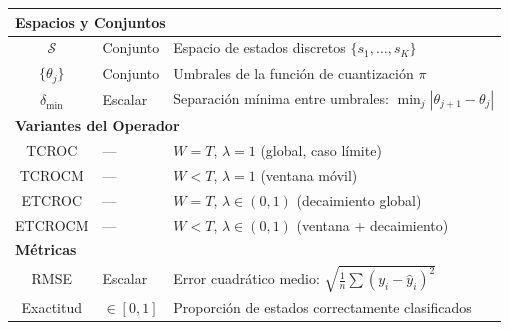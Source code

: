 \begin{longtable}{@{}clp{8cm}@{}}
\multicolumn{3}{l}{\textbf{Espacios y Conjuntos}} \\
\midrule
$\mathcal{S}$ & Conjunto & Espacio de estados discretos $\{s_1, \ldots, s_K\}$ \\
$\{\theta_j\}$ & Conjunto & Umbrales de la función de cuantización $\pi$ \\
$\delta_{\min}$ & Escalar & Separación mínima entre umbrales: $\min_j |\theta_{j+1} - \theta_j|$ \\
\midrule

\multicolumn{3}{l}{\textbf{Variantes del Operador}} \\
\midrule
TCROC & --- & $W = T$, $\lambda = 1$ (global, caso límite) \\
TCROCM & --- & $W < T$, $\lambda = 1$ (ventana móvil) \\
ETCROC & --- & $W = T$, $\lambda \in (0,1)$ (decaimiento global) \\
ETCROCM & --- & $W < T$, $\lambda \in (0,1)$ (ventana + decaimiento) \\
\midrule

\multicolumn{3}{l}{\textbf{Métricas}} \\
\midrule
RMSE & Escalar & Error cuadrático medio: $\sqrt{\frac{1}{n}\sum (y_i - \hat{y}_i)^2}$ \\
Exactitud & $\in [0,1]$ & Proporción de estados correctamente clasificados \\

\end{longtable}
